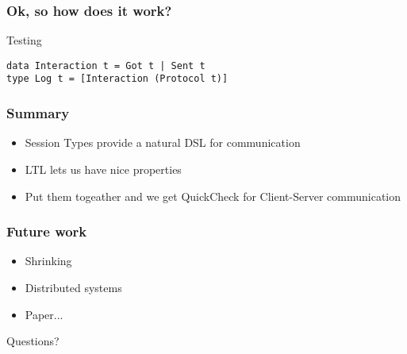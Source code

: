 \documentclass{beamer}
\begin{document}
\begin{frame}[fragile]
    \frametitle{Ok, so how does it work?}
    \centering
    \Large{Testing}
    \begin{verbatim}
data Interaction t = Got t | Sent t
type Log t = [Interaction (Protocol t)]
    \end{verbatim}
\end{frame}

\begin{frame}
    \frametitle{Summary}
    \begin{itemize}
        \item Session Types provide a natural DSL for communication
        \item LTL lets us have nice properties
        \item Put them togeather and we get QuickCheck for Client-Server communication
    \end{itemize}
\end{frame}

\begin{frame}
    \frametitle{Future work}
    \begin{itemize}
        \item Shrinking
        \item Distributed systems
        \item Paper...
    \end{itemize}
\end{frame}
\begin{frame}
    \Huge{\centerline{Questions?}}
\end{frame}
\end{document}
